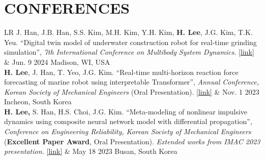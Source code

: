 \documentclass[a4paper,10pt]{extarticle}
\begin{document}
\section*{CONFERENCES}
\noindent
{}
\vspace*{-.5cm}
\begin{longtable}{LR}
	J. Han, J.B. Han, S.S. Kim, M.H. Kim, Y.H. Kim, \textbf{H. Lee}, J.G. Kim, T.K. Yeu. “Digital twin model of underwater construction robot for real-time grinding simulation”, \textit{7th International Conference on Multibody System Dynamics.} \href{https://easychair.org/publications/preprint/WkF3}{\color{blue}[link]}                                                                                                                                   & {Jun. 9 2024 \linebreak Madison, WI, USA}     \\
	\textbf{H. Lee}, J. Han, T. Yeo, J.G. Kim. “Real-time multi-horizon reaction force forecasting of marine robot using interpretable Transformer”, \textit{Annual Conference, Korean Society of Mechanical Engineers} (Oral Presentation). \href{https://www.dbpia.co.kr/Journal/articleDetail?nodeId=NODE11709087}{\color{blue}[link]}                                                                                                                           & {Nov. 1 2023 \linebreak Incheon, South Korea} \\
	\textbf{H. Lee,} S. Han, H.S. Choi, J.G. Kim. “Meta-modeling of nonlinear impulsive dynamics using composite neural network model with differential propagation”, \textit{Conference on Engineering Reliability, Korean Society of Mechanical Engineers} (\textbf{Excellent Paper Award}, Oral Presentation). \textsl{Extended works from IMAC 2023 presentation.} \href{https://www.dbpia.co.kr/journal/articleDetail?nodeId=NODE11511050}{\color{blue}[link]} & {May 18 2023 \linebreak Busan, South Korea}   \\

\end{longtable}
\end{document}
